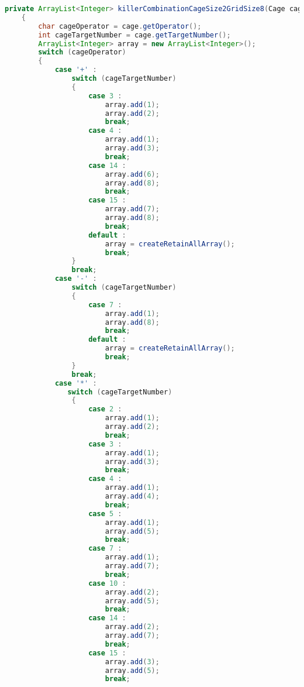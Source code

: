 \begin{lstlisting}[language=Java,basicstyle=\tiny,caption=SolverRuleBased.java]
    private ArrayList<Integer> killerCombinationCageSize2GridSize8(Cage cage)
    {
        char cageOperator = cage.getOperator();
        int cageTargetNumber = cage.getTargetNumber();
        ArrayList<Integer> array = new ArrayList<Integer>();
        switch (cageOperator)
        {
            case '+' :
                switch (cageTargetNumber)
                {
                    case 3 :
                        array.add(1);
                        array.add(2);
                        break;
                    case 4 :  
                        array.add(1);
                        array.add(3);
                        break;
                    case 14 :
                        array.add(6);
                        array.add(8);
                        break;
                    case 15 :
                        array.add(7);
                        array.add(8);
                        break;
                    default :
                        array = createRetainAllArray();
                        break;
                }
                break;
            case '-' :
                switch (cageTargetNumber)
                {
                    case 7 :
                        array.add(1);
                        array.add(8);
                        break;
                    default :
                        array = createRetainAllArray();
                        break;
                }
                break;
            case '*' :
               switch (cageTargetNumber)
                {
                    case 2 :
                        array.add(1);
                        array.add(2);
                        break;
                    case 3 :
                        array.add(1);
                        array.add(3);
                        break;
                    case 4 :
                        array.add(1);
                        array.add(4);
                        break;
                    case 5 :
                        array.add(1);
                        array.add(5);
                        break;
                    case 7 :
                        array.add(1);
                        array.add(7);
                        break;
                    case 10 :
                        array.add(2);
                        array.add(5);
                        break;
                    case 14 :
                        array.add(2);
                        array.add(7);
                        break;
                    case 15 :
                        array.add(3);
                        array.add(5);
                        break;

\end{lstlisting}
